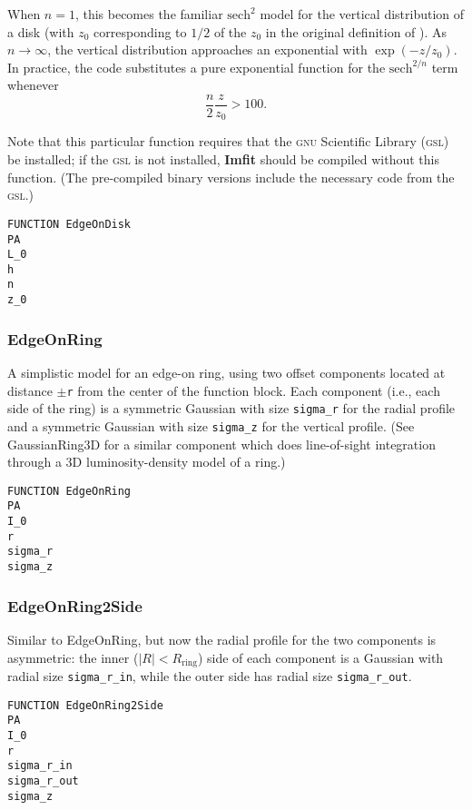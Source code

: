 \documentclass[10pt,a4paper,article]{memoir}
\newcommand{\imfit}{\textbf{Imfit}}
\begin{document}
When $n = 1$, this becomes the familiar $\mathrm{sech}^2$ model for the
vertical distribution of a disk (with $z_{0}$ corresponding to $1/2$ of the
$z_0$ in the original definition of \citet{vdk81}). As $n \rightarrow \infty$,
the vertical distribution approaches an exponential with $\exp(-z/z_{0})$. In practice,
the code substitutes a pure exponential function for the $\mathrm{sech}^{2/n}$ term whenever 
\begin{equation}
\frac{n}{2} \frac{z}{z_{0}} > 100.
\end{equation}

Note that this particular function requires that the \textsc{gnu} Scientific Library
(\textsc{gsl}) be installed; if the \textsc{gsl} is not installed, \imfit{} should be compiled
without this function. (The pre-compiled binary versions include the necessary
code from the \textsc{gsl}.)

\begin{verbatim}
FUNCTION EdgeOnDisk
PA
L_0
h
n
z_0
\end{verbatim}


\subsubsection{EdgeOnRing}

A simplistic model for an edge-on ring, using two offset components located
at distance $\pm$\texttt{r} from the center of the function block. Each component
(i.e., each side of the ring) is a symmetric Gaussian with size
\texttt{sigma\_r} for the radial profile and a symmetric Gaussian with
size \texttt{sigma\_z} for the vertical profile. (See GaussianRing3D for a similar
component which does line-of-sight integration through a 3D luminosity-density
model of a ring.)

\begin{verbatim}
FUNCTION EdgeOnRing
PA
I_0
r
sigma_r
sigma_z
\end{verbatim}


\subsubsection{EdgeOnRing2Side}

Similar to EdgeOnRing, but now the radial profile for the two components is
asymmetric: the inner ($|R| < R_{\mathrm{ring}}$) side of each component is a Gaussian
with radial size \texttt{sigma\_r\_in}, while the outer side has radial size
\texttt{sigma\_r\_out}.

\begin{verbatim}
FUNCTION EdgeOnRing2Side
PA
I_0
r
sigma_r_in
sigma_r_out
sigma_z
\end{verbatim}
\end{document}
